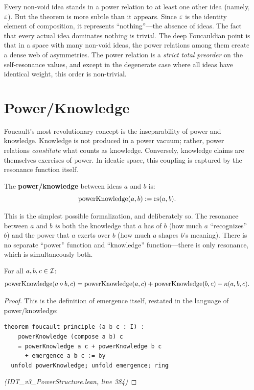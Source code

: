 \begin{interpretation}
Every non-void idea stands in a power relation to at least one other idea
(namely, $\varepsilon$). But the theorem is more subtle than it appears. Since
$\varepsilon$ is the identity element of composition, it represents ``nothing''---the
absence of ideas. The fact that every actual idea dominates nothing is trivial.
The deep Foucauldian point is that in a space with many non-void ideas, the
power relations among them create a dense web of asymmetries. The power relation
is a \emph{strict total preorder} on the self-resonance values, and except in
the degenerate case where all ideas have identical weight, this order is
non-trivial.
\end{interpretation}

\section{Power/Knowledge}

Foucault's most revolutionary concept is the inseparability of power and
knowledge. Knowledge is not produced in a power vacuum; rather, power relations
\emph{constitute} what counts as knowledge. Conversely, knowledge claims are
themselves exercises of power. In ideatic space, this coupling is captured by
the resonance function itself.

\begin{definition}
\label{def:power-knowledge}
The \textbf{power/knowledge} between ideas $a$ and $b$ is:
\[
  \mathrm{powerKnowledge}(a, b) := \mathrm{rs}(a, b).
\]
\end{definition}

This is the simplest possible formalization, and deliberately so. The resonance
between $a$ and $b$ \emph{is} both the knowledge that $a$ has of $b$ (how much
$a$ ``recognizes'' $b$) and the power that $a$ exerts over $b$ (how much $a$
shapes $b$'s meaning). There is no separate ``power'' function and ``knowledge''
function---there is only resonance, which is simultaneously both.

\begin{theorem}
\label{thm:foucault}
For all $a, b, c \in \mathcal{I}$:
\[
  \mathrm{powerKnowledge}(a \circ b, c) = \mathrm{powerKnowledge}(a, c) + \mathrm{powerKnowledge}(b, c) + \kappa(a, b, c).
\]
\end{theorem}

\begin{proof}
This is the definition of emergence itself, restated in the language of power/knowledge:
\begin{lstlisting}
theorem foucault_principle (a b c : I) :
    powerKnowledge (compose a b) c
    = powerKnowledge a c + powerKnowledge b c
      + emergence a b c := by
  unfold powerKnowledge; unfold emergence; ring
\end{lstlisting}
\textit{(IDT\_v3\_PowerStructure.lean, line 384)}
\end{proof}

